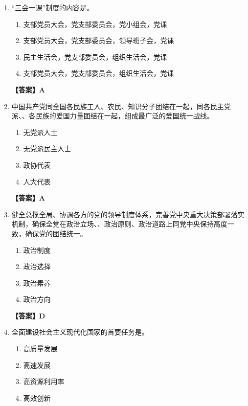 \documentclass[UTF8,11pt,a4paper]{ctexart}
\begin{document}
\begin{enumerate}[label=\textbf{\arabic*.}, leftmargin=2.5em, itemsep=0.7em]
\begin{enumerate}[label=\Alph*., leftmargin=2em, itemsep=0.1em, topsep=0.15em]
\end{enumerate}
\textbf{【答案】D}
\item “三会一课”制度的内容是\allowbreak\underline{\hspace{4em}}。
\begin{enumerate}[label=\Alph*., leftmargin=2em, itemsep=0.1em, topsep=0.15em]
\item 支部党员大会，党支部委员会，党小组会，党课
\item 支部党员大会，党支部委员会，领导班子会，党课
\item 民主生活会，党支部委员会，组织生活会，党课
\item 支部党员大会，党支部委员会，组织生活会，党课
\end{enumerate}
\textbf{【答案】A}
\item 中国共产党同全国各民族工人、农民、知识分子团结在一起，同各民主党派、\allowbreak\underline{\hspace{4em}}、各民族的爱国力量团结在一起，组成最广泛的爱国统一战线。
\begin{enumerate}[label=\Alph*., leftmargin=2em, itemsep=0.1em, topsep=0.15em]
\item 无党派人士
\item 无党派民主人士
\item 政协代表
\item 人大代表
\end{enumerate}
\textbf{【答案】A}
\item 健全总揽全局、协调各方的党的领导制度体系，完善党中央重大决策部署落实机制，确保全党在政治立场、\allowbreak\underline{\hspace{4em}}、政治原则、政治道路上同党中央保持高度一致，确保党的团结统一。
\begin{enumerate}[label=\Alph*., leftmargin=2em, itemsep=0.1em, topsep=0.15em]
\item 政治制度
\item 政治选择
\item 政治素养
\item 政治方向
\end{enumerate}
\textbf{【答案】D}
\item 全面建设社会主义现代化国家的首要任务是\allowbreak\underline{\hspace{4em}}。
\begin{enumerate}[label=\Alph*., leftmargin=2em, itemsep=0.1em, topsep=0.15em]
\item 高质量发展
\item 高速发展
\item 高资源利用率
\item 高效创新

\end{enumerate}
\end{enumerate}
\end{document}
